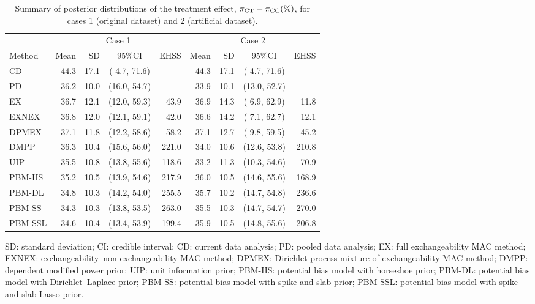 \documentclass[
]{article}
\begin{document}
\begin{table}[!h]

\begin{threeparttable}
\caption{\label{tab:tab1}Summary of posterior distributions of the treatment effect, $\pi_{\rm CT}-\pi_{\rm CC} (\%)$, for cases 1 (original dataset) and 2 (artificial dataset).}
\centering
\fontsize{11}{13}\selectfont
\begin{tabular}[t]{lrrcrrrcr}
\toprule
\multicolumn{1}{c}{ } & \multicolumn{4}{c}{Case 1} & \multicolumn{4}{c}{Case 2} \\
\cmidrule(l{3pt}r{3pt}){2-5} \cmidrule(l{3pt}r{3pt}){6-9}
Method & Mean & SD & 95\%CI & EHSS & Mean & SD & 95\%CI & EHSS\\
\midrule
CD & 44.3 & 17.1 & ( 4.7, 71.6) &  & 44.3 & 17.1 & ( 4.7, 71.6) & \\
PD & 36.2 & 10.0 & (16.0, 54.7) &  & 33.9 & 10.1 & (13.0, 52.7) & \\
EX & 36.7 & 12.1 & (12.0, 59.3) & 43.9 & 36.9 & 14.3 & ( 6.9, 62.9) & 11.8\\
EXNEX & 36.8 & 12.0 & (12.1, 59.1) & 42.0 & 36.6 & 14.2 & ( 7.1, 62.7) & 12.1\\
DPMEX & 37.1 & 11.8 & (12.2, 58.6) & 58.2 & 37.1 & 12.7 & ( 9.8, 59.5) & 45.2\\
DMPP & 36.3 & 10.4 & (15.6, 56.0) & 221.0 & 34.0 & 10.6 & (12.6, 53.8) & 210.8\\
UIP & 35.5 & 10.8 & (13.8, 55.6) & 118.6 & 33.2 & 11.3 & (10.3, 54.6) & 70.9\\
PBM-HS & 35.2 & 10.5 & (13.9, 54.6) & 217.9 & 36.0 & 10.5 & (14.6, 55.6) & 168.9\\
PBM-DL & 34.8 & 10.3 & (14.2, 54.0) & 255.5 & 35.7 & 10.2 & (14.7, 54.8) & 236.6\\
PBM-SS & 34.3 & 10.3 & (13.8, 53.5) & 263.0 & 35.5 & 10.3 & (14.7, 54.7) & 270.0\\
PBM-SSL & 34.6 & 10.4 & (13.4, 53.9) & 199.4 & 35.9 & 10.5 & (14.8, 55.6) & 206.8\\
\bottomrule
\end{tabular}
\begin{tablenotes}
\small
\item [] SD: standard deviation; CI: credible interval; CD: current data analysis; PD: pooled data analysis; EX: full exchangeability MAC method; EXNEX: exchangeability--non-exchangeability MAC method; DPMEX: Dirichlet process mixture of exchangeability MAC method; DMPP: dependent modified power prior; UIP: unit information prior; PBM-HS: potential bias model with horseshoe prior; PBM-DL: potential bias model with Dirichlet--Laplace prior; PBM-SS: potential bias model with spike-and-slab prior; PBM-SSL: potential bias model with spike-and-slab Lasso prior.
\end{tablenotes}
\end{threeparttable}
\end{table}
\end{document}
